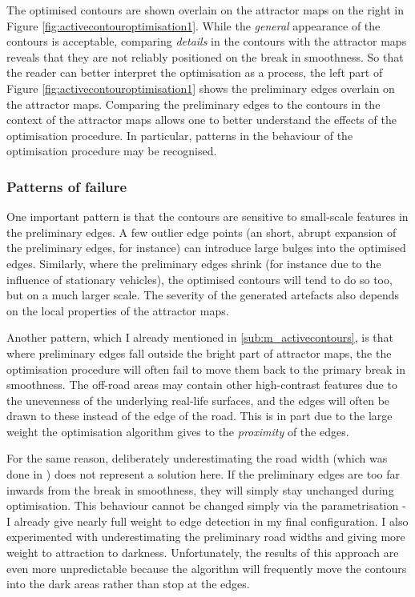 The optimised contours are shown overlain on the attractor maps on the right in Figure \ref{fig:activecontouroptimisation1}. While the \textit{general} appearance of the contours is acceptable, comparing \textit{details} in the contours with the attractor maps reveals that they are not reliably positioned on the break in smoothness. So that the reader can better interpret the optimisation as a process, the left part of Figure \ref{fig:activecontouroptimisation1} shows the preliminary edges overlain on the attractor maps. Comparing the preliminary edges to the contours in the context of the attractor maps allows one to better understand the effects of the optimisation procedure. In particular, patterns in the behaviour of the optimisation procedure may be recognised.

\subsubsection{Patterns of failure}

One important pattern is that the contours are sensitive to small-scale features in the preliminary edges. A few outlier edge points (an short, abrupt expansion of the preliminary edges, for instance) can introduce large bulges into the optimised edges. Similarly, where the preliminary edges shrink (for instance due to the influence of stationary vehicles), the optimised contours will tend to do so too, but on a much larger scale. The severity of the generated artefacts also depends on the local properties of the attractor maps.

Another pattern, which I already mentioned in \ref{sub:m_activecontours}, is that where preliminary edges fall outside the bright part of attractor maps, the the optimisation procedure will often fail to move them back to the primary break in smoothness. The off-road areas may contain other high-contrast features due to the unevenness of the underlying real-life surfaces, and the edges will often be drawn to these instead of the edge of the road. This is in part due to the large weight the optimisation algorithm gives to the \textit{proximity} of the edges.

For the same reason, deliberately underestimating the road width (which was done in \cite{boyko_funkhauser_2011}) does not represent a solution here. If the preliminary edges are too far inwards from the break in smoothness, they will simply stay unchanged during optimisation. This behaviour cannot be changed simply via the parametrisation - I already give nearly full weight to edge detection in my final configuration. I also experimented with underestimating the preliminary road widths and giving more weight to attraction to darkness. Unfortunately, the results of this approach are even more unpredictable because the algorithm will frequently move the contours into the dark areas rather than stop at the edges.

